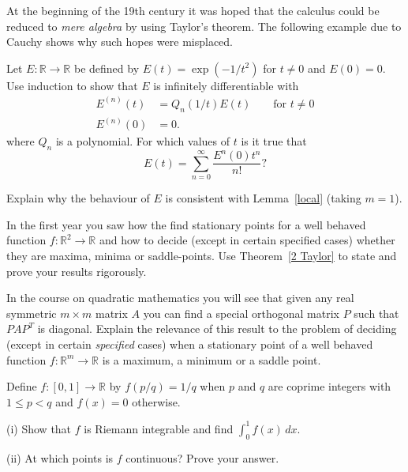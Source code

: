 \vspace{1\baselineskip}

\begin{question}
At the beginning of the 19th century it was
hoped that the calculus could be reduced to 
\emph{mere algebra} by using Taylor's theorem.
The following example due to Cauchy shows why
such hopes were misplaced.

Let $E:{\mathbb R}\rightarrow{\mathbb R}$ be defined
by $E(t)=\exp(-1/t^{2})$ for $t\neq 0$ and $E(0)=0$.
Use induction to show that $E$ is infinitely differentiable
with
\begin{align*}
E^{(n)}(t)&=Q_{n}(1/t)E(t)\qquad\text{for $t\neq 0$}\\
E^{(n)}(0)&=0.
\end{align*}
where $Q_{n}$ is a polynomial.
For which values of $t$ is it true that
\[E(t)=\sum_{n=0}^{\infty}\frac{E^{n}(0)t^{n}}{n!}?\] 

Explain why the behaviour of $E$ is consistent
with Lemma~\ref{local} (taking $m=1$).

\end{question}
\begin{question}
In the first year you saw how the find
stationary points for a well behaved
function $f:{\mathbb R}^{2}\rightarrow{\mathbb R}$
and how to decide (except in
certain specified cases) whether they
are maxima, minima or saddle-points.
Use Theorem~\ref{2 Taylor} to state and
prove your results rigorously.

In the course on quadratic mathematics you
will see that given any real symmetric $m\times m$
matrix $A$ you can find a special orthogonal
matrix $P$ such that $PAP^{T}$ is diagonal.
Explain the relevance of this result to
the problem of deciding (except in certain
\emph{specified} cases) when a stationary
point of a well behaved function
$f:{\mathbb R}^{m}\rightarrow{\mathbb R}$
is a maximum, a minimum or a saddle point.

\end{question}
\begin{question}
Define $f:[0,1]\rightarrow{\mathbb R}$ by
$f(p/q)=1/q$ when $p$ and $q$ are coprime integers
with $1\leq p <q$ and $f(x)=0$ otherwise.

(i) Show that $f$ is Riemann integrable and
find $\int_{0}^{1}f(x)\,dx$.

(ii) At which points is $f$ continuous? Prove
your answer.

\end{question}
